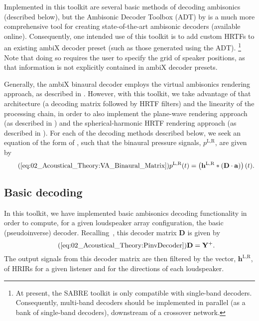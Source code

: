 Implemented in this toolkit are several basic methods of decoding ambisonics (described below),
but the Ambisonic Decoder Toolbox (ADT) by \citet{Heller2012} is a much more comprehensive tool for creating state-of-the-art ambisonic decoders (available online).
Consequently, one intended use of this toolkit is to add custom HRTFs to an existing ambiX decoder preset (such as those generated using the ADT).%
\footnote{At present, the SABRE toolkit is only compatible with single-band decoders.
Consequently, multi-band decoders should be implemented in parallel (as a bank of single-band decoders), downstream of a crossover network.}
Note that doing so requires the user to specify the grid of speaker positions, as that information is not explicitly contained in ambiX decoder presets.

Generally, the ambiX binaural decoder employs the virtual ambisonics rendering approach, as described in .
However, with this toolkit, we take advantage of that architecture (a decoding matrix followed by HRTF filters) and the linearity of the processing chain, in order to also implement the plane-wave rendering approach (as described in ) and the spherical-harmonic HRTF rendering approach (as described in ).
For each of the decoding methods described below, we seek an equation of the form of , such that the binaural pressure signals, $p^{\text{L,R}}$, are given by
\begin{equation}\tag{\ref{eq:02_Acoustical_Theory:VA_Binaural_Matrix}}
p^{\text{L,R}}(t) = \left( \mathbf{h}^{\text{L,R}} \ast \left( \mathbf{D} \cdot \mathbf{a} \right) \right)(t).
\end{equation}

\subsection{Basic decoding}
In this toolkit, we have implemented basic ambisonics decoding functionality in order to compute,
for a given loudspeaker array configuration, the basic (pseudoinverse) decoder.
Recalling~, this decoder matrix $\mathbf{D}$ is given by
\begin{equation}\tag{\ref{eq:02_Acoustical_Theory:PinvDecoder}}
\mathbf{D} = \mathbf{Y}^{+}.
\end{equation}
The output signals from this decoder matrix are then filtered by the vector, $\mathbf{h}^{\text{L,R}}$, of HRIRs for a given listener and for the directions of each loudspeaker.

